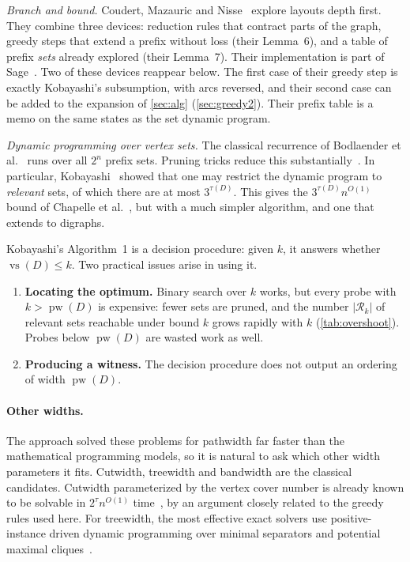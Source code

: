 \documentclass[11pt]{article}
\theoremstyle{definition}
\newcommand{\vs}{\operatorname{vs}}
\newcommand{\pw}{\operatorname{pw}}
\newcommand{\Rel}{\mathcal{R}}
\begin{document}
\emph{Branch and bound.} Coudert, Mazauric and Nisse~\cite{CMN14} explore
layouts depth first. They combine three devices: reduction rules that
contract parts of the graph, greedy steps that extend a prefix without loss
(their Lemma~6), and a table of prefix \emph{sets} already explored (their
Lemma~7). Their implementation is part of Sage~\cite{Sage}. Two of these
devices reappear below. The first case of their greedy step is exactly
Kobayashi's subsumption, with arcs reversed, and their second case can be
added to the expansion of \cref{sec:alg} (\cref{sec:greedy2}). Their prefix
table is a memo on the same states as the set dynamic program.

\emph{Dynamic programming over vertex sets.} The classical recurrence of
Bodlaender et al.~\cite{BFKKT12} runs over all $2^n$ prefix sets. Pruning
tricks reduce this substantially~\cite{SV09,KKKTT12,Tam11}. In particular,
Kobayashi~\cite{Kob15} showed that one may restrict the dynamic program to
\emph{relevant} sets, of which there are at most $3^{\tau(D)}$. This gives
the $3^{\tau(D)}n^{O(1)}$ bound of Chapelle et al.~\cite{CLTV13}, but with a
much simpler algorithm, and one that extends to digraphs.

Kobayashi's Algorithm~1 is a decision procedure: given $k$, it answers
whether $\vs(D)\le k$. Two practical issues arise in using it.

\begin{enumerate}
\item \textbf{Locating the optimum.} Binary search over $k$ works, but every
probe with $k>\pw(D)$ is expensive: fewer sets are pruned, and the number
$|\Rel_k|$ of relevant sets reachable under bound $k$ grows rapidly with $k$
(\cref{tab:overshoot}). Probes below $\pw(D)$ are wasted work as well.
\item \textbf{Producing a witness.} The decision procedure does not output an
ordering of width $\pw(D)$.
\end{enumerate}

\paragraph{Other widths.} The approach solved these problems for pathwidth
far faster than the mathematical programming models, so it is natural to
ask which other width parameters it fits. Cutwidth, treewidth and
bandwidth are the classical candidates. Cutwidth parameterized by the
vertex cover number is already known to be solvable in $2^{\tau}n^{O(1)}$
time~\cite{CLPPS14}, by an argument closely related to the greedy rules
used here. For treewidth, the most effective exact solvers use
positive-instance driven dynamic programming over minimal separators and
potential maximal cliques~\cite{Tam19}.
\end{document}
